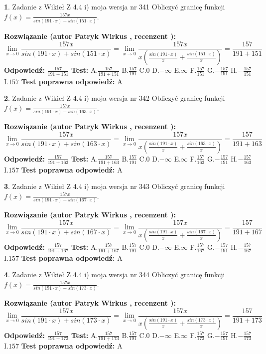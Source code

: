 \documentclass[12pt, a4paper]{article}
\theoremstyle{definition} %
\newtheorem{zad}{}
\newcommand{\zadStart}[1]{\begin{zad}#1\newline}
\newcommand{\zadStop}{\end{zad}}
\newcommand{\rozwStart}[2]{\noindent \textbf{Rozwiązanie (autor #1 , recenzent #2): }\newline}
\newcommand{\rozwStop}{\newline}
\newcommand{\odpStart}{\noindent \textbf{Odpowiedź:}\newline}
\newcommand{\odpStop}{\newline}
\newcommand{\testStart}{\noindent \textbf{Test:}\newline}
\newcommand{\testStop}{\newline}
\newcommand{\kluczStart}{\noindent \textbf{Test poprawna odpowiedź:}\newline}
\newcommand{\kluczStop}{\newline}
\begin{document}
\zadStart{Zadanie z Wikieł Z 4.4 i) moja wersja nr 341}
Obliczyć granicę funkcji $f(x)=\frac{157x}{sin(191\cdot x) +sin(151\cdot x)}$.
\zadStop
\rozwStart{Patryk Wirkus}{}
$$\lim\limits_{x\to 0}\frac{157x}{sin(191\cdot x) +sin(151\cdot x)}=\lim\limits_{x\to 0}\frac{157x}{x(\frac{sin(191\cdot x)}{x}+\frac{sin(151\cdot x)}{x})}=\frac{157}{191+151}$$
\rozwStop
\odpStart
$\frac{157}{191+151}$
\odpStop
\testStart
A.$\frac{157}{191+151}$
B.$\frac{157}{191}$
C.$0$
D.$-\infty$
E.$\infty$
F.$\frac{157}{151}$
G.$-\frac{157}{191}$
H.$-\frac{157}{151}$
I.$157$
\testStop
\kluczStart
A
\kluczStop



\zadStart{Zadanie z Wikieł Z 4.4 i) moja wersja nr 342}
Obliczyć granicę funkcji $f(x)=\frac{157x}{sin(191\cdot x) +sin(163\cdot x)}$.
\zadStop
\rozwStart{Patryk Wirkus}{}
$$\lim\limits_{x\to 0}\frac{157x}{sin(191\cdot x) +sin(163\cdot x)}=\lim\limits_{x\to 0}\frac{157x}{x(\frac{sin(191\cdot x)}{x}+\frac{sin(163\cdot x)}{x})}=\frac{157}{191+163}$$
\rozwStop
\odpStart
$\frac{157}{191+163}$
\odpStop
\testStart
A.$\frac{157}{191+163}$
B.$\frac{157}{191}$
C.$0$
D.$-\infty$
E.$\infty$
F.$\frac{157}{163}$
G.$-\frac{157}{191}$
H.$-\frac{157}{163}$
I.$157$
\testStop
\kluczStart
A
\kluczStop



\zadStart{Zadanie z Wikieł Z 4.4 i) moja wersja nr 343}
Obliczyć granicę funkcji $f(x)=\frac{157x}{sin(191\cdot x) +sin(167\cdot x)}$.
\zadStop
\rozwStart{Patryk Wirkus}{}
$$\lim\limits_{x\to 0}\frac{157x}{sin(191\cdot x) +sin(167\cdot x)}=\lim\limits_{x\to 0}\frac{157x}{x(\frac{sin(191\cdot x)}{x}+\frac{sin(167\cdot x)}{x})}=\frac{157}{191+167}$$
\rozwStop
\odpStart
$\frac{157}{191+167}$
\odpStop
\testStart
A.$\frac{157}{191+167}$
B.$\frac{157}{191}$
C.$0$
D.$-\infty$
E.$\infty$
F.$\frac{157}{167}$
G.$-\frac{157}{191}$
H.$-\frac{157}{167}$
I.$157$
\testStop
\kluczStart
A
\kluczStop



\zadStart{Zadanie z Wikieł Z 4.4 i) moja wersja nr 344}
Obliczyć granicę funkcji $f(x)=\frac{157x}{sin(191\cdot x) +sin(173\cdot x)}$.
\zadStop
\rozwStart{Patryk Wirkus}{}
$$\lim\limits_{x\to 0}\frac{157x}{sin(191\cdot x) +sin(173\cdot x)}=\lim\limits_{x\to 0}\frac{157x}{x(\frac{sin(191\cdot x)}{x}+\frac{sin(173\cdot x)}{x})}=\frac{157}{191+173}$$
\rozwStop
\odpStart
$\frac{157}{191+173}$
\odpStop
\testStart
A.$\frac{157}{191+173}$
B.$\frac{157}{191}$
C.$0$
D.$-\infty$
E.$\infty$
F.$\frac{157}{173}$
G.$-\frac{157}{191}$
H.$-\frac{157}{173}$
I.$157$
\testStop
\kluczStart
A
\kluczStop
\end{document}

